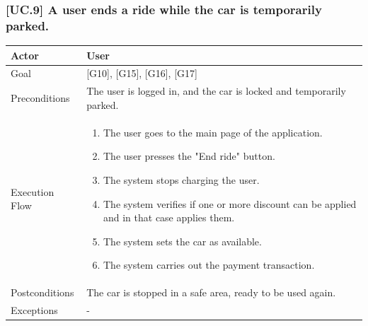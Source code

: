 \documentclass[english]{article}
\begin{document}
    \subsubsection{[UC.9] A user ends a ride while the car is temporarily parked.}
    		\begin{tabularx}{\textwidth}{  l  X  }
    			\hline
    			Actor & User\\
    			\hline
    			Goal & [G10], [G15], [G16], [G17]\\
    			\hline
    			Preconditions & The user is logged in, and the car is locked and temporarily parked.\\
    			\hline
    			Execution Flow & \begin{enumerate}
    				\item{The user goes to the main page of the application.}
    				\item{The user presses the "End ride" button.}
            \item{The system stops charging the user.}
            \item{The system verifies if one or more discount can be applied and in that case applies them.}
    				\item{The system sets the car as available.}
    				\item{The system carries out the payment transaction.}
    				\end{enumerate}\\
    				\hline
    				Postconditions & The car is stopped in a safe area, ready to be used again.\\
    				\hline
    				Exceptions & -\\
    				\hline
    		\end{tabularx}
\end{document}
